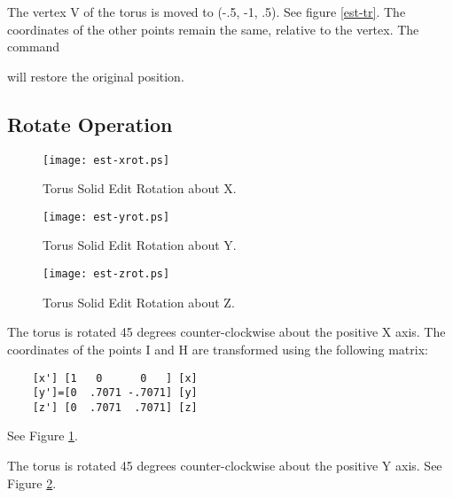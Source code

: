 
The vertex V of the torus is moved to (-.5, -1, .5).
See figure \ref{est-tr}.  The
coordinates of the other points remain the same, relative to the vertex.
The command


will restore the original position.

\subsection{Rotate Operation}

\begin{figure}
\centering \texttt{[image: est-xrot.ps]}
\caption{Torus Solid Edit Rotation about X.}
\label{est-xrot}
\end{figure}

\begin{figure}
\centering \texttt{[image: est-yrot.ps]}
\caption{Torus Solid Edit Rotation about Y.}
\label{est-yrot}
\end{figure}

\begin{figure}
\centering \texttt{[image: est-zrot.ps]}
\caption{Torus Solid Edit Rotation about Z.}
\label{est-zrot}
\end{figure}


The torus is rotated 45 degrees counter-clockwise about the positive X axis.
The
coordinates of the points I and H are transformed using the following matrix:
\begin{verbatim}
    [x'] [1   0      0   ] [x]
    [y']=[0  .7071 -.7071] [y]
    [z'] [0  .7071  .7071] [z]
\end{verbatim}
See Figure \ref{est-xrot}.


The torus is rotated 45 degrees counter-clockwise about the positive Y axis.
See Figure \ref{est-yrot}.


